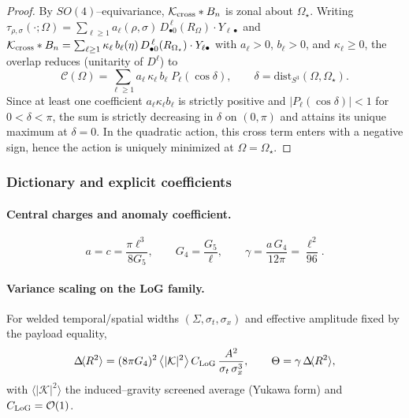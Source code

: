 \documentclass[10pt]{article}
\theoremstyle{definition}
\theoremstyle{plain}
\begin{document}
\begin{proof}
By $SO(4)$--equivariance, $\mathcal K_{\rm cross}*B_n$ is zonal about $\Omega_\star$. Writing
\(
\tau_{\rho,\sigma}(\cdot;\Omega)=\sum_{\ell\ge 1} a_\ell(\rho,\sigma)\,D^{\,\ell}_{\bullet 0}(R_\Omega)\cdot Y_{\ell\bullet}
\)
and
\(
\mathcal K_{\rm cross}*B_n=\sum_{\ell\ge 1}\kappa_\ell\,b_\ell(\eta)\,D^{\,\ell}_{\bullet 0}(R_{\Omega_\star})\cdot Y_{\ell\bullet}
\)
with $a_\ell>0$, $b_\ell>0$, and $\kappa_\ell\ge 0$, the overlap reduces (unitarity of $D^{\ell}$) to
\[
\mathcal C(\Omega)=\sum_{\ell\ge 1} a_\ell\,\kappa_\ell\,b_\ell\;P_\ell(\cos\delta),\qquad \delta=\mathrm{dist}_{S^3}(\Omega,\Omega_\star).
\]
Since at least one coefficient $a_\ell\kappa_\ell b_\ell$ is strictly positive and $|P_\ell(\cos\delta)|<1$
for $0<\delta<\pi$, the sum is strictly decreasing in $\delta$ on $(0,\pi)$ and attains its unique maximum
at $\delta=0$. In the quadratic action, this cross term enters with a negative sign, hence the action is uniquely minimized at $\Omega=\Omega_\star$.
\end{proof}




\subsubsection{Dictionary and explicit coefficients}
\label{subsubsec:dictionary}

\paragraph{Central charges and anomaly coefficient.}\label{par:uom-main-089}
\[
a=c=\frac{\pi \ell^3}{8G_5},\qquad
G_4=\frac{G_5}{\ell},\qquad
\gamma=\frac{a\,G_4}{12\pi}=\frac{\ell^2}{96}.
\]

\paragraph{Variance scaling on the LoG family.}\label{par:uom-main-090}
For welded temporal/spatial widths $(\Sigma,\sigma_t,\sigma_x)$ and effective amplitude fixed by the payload equality,
\begin{equation}
\Delta\!\langle R^2\rangle
=(8\pi G_4)^2\,\big\langle |\mathcal K|^2\big\rangle
\,C_{\rm LoG}\,
\frac{A^2}{\sigma_t\,\sigma_x^3},
\qquad
\Theta=\gamma\,\Delta\!\langle R^2\rangle,
\end{equation}
with $\langle|\mathcal K|^2\rangle$ the induced–gravity screened average (Yukawa form) and $C_{\rm LoG}=\mathcal O(1)$.
\end{document}
